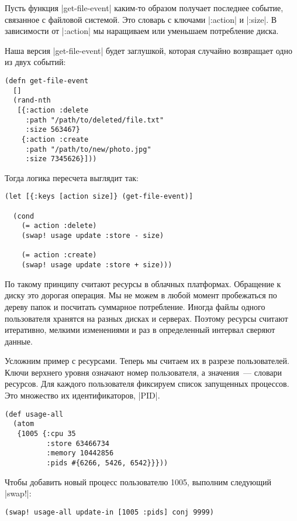 Пусть функция \spverb|get-file-event| каким-то образом получает последнее событие,
связанное с файловой системой. Это словарь с ключами \spverb|:action| и \spverb|:size|. В
зависимости от \spverb|:action| мы наращиваем или уменьшаем потребление диска.

Наша версия \spverb|get-file-event| будет заглушкой, которая случайно возвращает одно
из двух событий:

\begin{verbatim}
(defn get-file-event
  []
  (rand-nth
   [{:action :delete
     :path "/path/to/deleted/file.txt"
     :size 563467}
    {:action :create
     :path "/path/to/new/photo.jpg"
     :size 7345626}]))
\end{verbatim}

Тогда логика пересчета выглядит так:

\begin{verbatim}
(let [{:keys [action size]} (get-file-event)]

  (cond
    (= action :delete)
    (swap! usage update :store - size)

    (= action :create)
    (swap! usage update :store + size)))
\end{verbatim}

По такому принципу считают ресурсы в облачных платформах. Обращение к диску это
дорогая операция. Мы не можем в любой момент пробежаться по дереву папок и
посчитать суммарное потребление. Иногда файлы одного пользователя хранятся на
разных дисках и серверах. Поэтому ресурсы считают итеративно, мелкими
изменениями и раз в определенный интервал сверяют данные.

Усложним пример с ресурсами. Теперь мы считаем их в разрезе пользователей. Ключи
верхнего уровня означают номер пользователя, а значения~--- словари ресурсов. Для
каждого пользователя фиксируем список запущенных процессов. Это множество их
идентификаторов, \spverb|PID|.

\begin{verbatim}
(def usage-all
  (atom
   {1005 {:cpu 35
          :store 63466734
          :memory 10442856
          :pids #{6266, 5426, 6542}}}))
\end{verbatim}

Чтобы добавить новый процесс пользователю 1005, выполним следующий \spverb|swap!|:

\begin{verbatim}
(swap! usage-all update-in [1005 :pids] conj 9999)
\end{verbatim}

